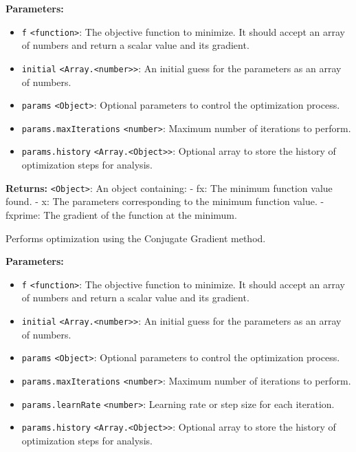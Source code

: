 \documentclass[12pt,a4paper]{article}
\begin{document}
\noindent \textbf{Parameters:}
\begin{itemize}
  \item \texttt{f} \texttt{<function>}: The objective function to minimize. It should accept an array of numbers and return a scalar value and its gradient.
  \item \texttt{initial} \texttt{<Array.<number>>}: An initial guess for the parameters as an array of numbers.
  \item \texttt{params} \texttt{<Object>}: Optional parameters to control the optimization process.
  \item \texttt{params.maxIterations} \texttt{<number>}: Maximum number of iterations to perform.
  \item \texttt{params.history} \texttt{<Array.<Object>>}: Optional array to store the history of optimization steps for analysis.
\end{itemize}

\noindent \textbf{Returns:} \texttt{<Object>}: An object containing:
  - \textasciigrave{}fx\textasciigrave{}: The minimum function value found.
  - \textasciigrave{}x\textasciigrave{}: The parameters corresponding to the minimum function value.
  - \textasciigrave{}fxprime\textasciigrave{}: The gradient of the function at the minimum.

\noindent Performs optimization using the Conjugate Gradient method.

\vspace{5mm}
\noindent {}


\noindent \textbf{Parameters:}
\begin{itemize}
  \item \texttt{f} \texttt{<function>}: The objective function to minimize. It should accept an array of numbers and return a scalar value and its gradient.
  \item \texttt{initial} \texttt{<Array.<number>>}: An initial guess for the parameters as an array of numbers.
  \item \texttt{params} \texttt{<Object>}: Optional parameters to control the optimization process.
  \item \texttt{params.maxIterations} \texttt{<number>}: Maximum number of iterations to perform.
  \item \texttt{params.learnRate} \texttt{<number>}: Learning rate or step size for each iteration.
  \item \texttt{params.history} \texttt{<Array.<Object>>}: Optional array to store the history of optimization steps for analysis.
\end{itemize}
\end{document}

